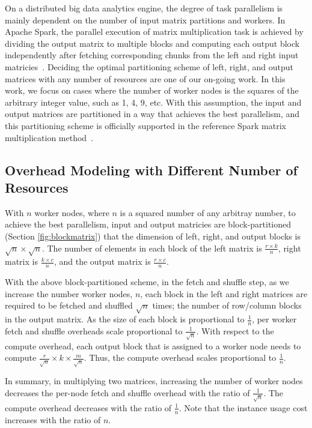 \documentclass[10pt, conference, compsocconf]{IEEEtran}
\begin{document}
On a distributed big data analytics engine, the degree of task parallelism is mainly dependent on the number of input matrix partitions and workers. In Apache Spark, the parallel execution of matrix multiplication task is achieved by dividing the output matrix to multiple blocks and computing each output block independently after fetching corresponding chunks from the left and right input matricies~\cite{spark-mm}. Deciding the optimal partitioning scheme of left, right, and output matrices with any number of resources are one of our on-going work. In this work, we focus on cases where the number of worker nodes is the squares of the arbitrary integer value, such as 1, 4, 9, etc. With this assumption, the input and output matrices are partitioned in a way that achieves the best parallelism, and this partitioning scheme is officially supported in the reference Spark matrix multiplication method~\cite{spark-mm-code}.

\subsection{Overhead Modeling with Different Number of Resources}\label{sec:overhead-number-of-nodes}
With $n$ worker nodes, where $n$ is a squared number of any arbitray number, to achieve the best parallelism, input and output matricies are block-partitioned (Section \ref{fig:blockmatrix}) that the dimension of left, right, and output blocks is $\sqrt{n} \times \sqrt{n}$. The number of elements in each block of the left matrix is $\frac{r \times k}{n}$, right matrix is $\frac{k \times c}{n}$, and the output matrix is $\frac{r \times c}{n}$.

With the above block-partitioned scheme, in the fetch and shuffle step, as we increase the number worker nodes, $n$, each block in the left and right matrices are required to be fetched and shuffled $\sqrt{n}$ times; the number of row/column blocks in the output matrix. As the size of each block is proportional to $\frac{1}{n}$, per worker fetch and shuffle overheads scale proportional to $\frac{1}{\sqrt{n}}$. With respect to the compute overhead, each output block that is assigned to a worker node needs to compute $\frac{r}{\sqrt{n}}\times k \times \frac{m}{\sqrt{n}}$. Thus, the compute overhead scales proportional to $\frac{1}{n}$.

In summary, in multiplying two matrices, increasing the number of worker nodes decreases the per-node fetch and shuffle overhead with the ratio of $\frac{1}{\sqrt{n}}$. The compute overhead decreases with the ratio of $\frac{1}{n}$. Note that the instance usage cost increases with the ratio of $n$.
\end{document}
